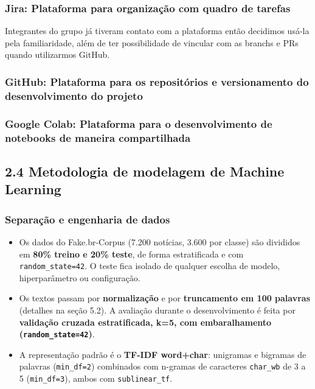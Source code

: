\documentclass[
  brazilian,
  11pt,
]{article}
\providecommand{\tightlist}{%
  \setlength{\itemsep}{0pt}\setlength{\parskip}{0pt}}
\begin{document}
\subsubsection{\texorpdfstring{\textbf{Jira:} Plataforma para organização com quadro de tarefas}{Jira: Plataforma para organização com quadro de tarefas}}\label{jira-plataforma-para-organizauxe7uxe3o-com-quadro-de-tarefas}

Integrantes do grupo já tiveram contato com a plataforma então decidimos usá-la pela familiaridade, além de ter possibilidade de vincular com as branchs e PRs quando utilizarmos GitHub.

\subsubsection{\texorpdfstring{\textbf{GitHub:} Plataforma para os repositórios e versionamento do desenvolvimento do projeto}{GitHub: Plataforma para os repositórios e versionamento do desenvolvimento do projeto}}\label{github-plataforma-para-os-reposituxf3rios-e-versionamento-do-desenvolvimento-do-projeto}

\subsubsection{\texorpdfstring{\textbf{Google Colab:} Plataforma para o desenvolvimento de notebooks de maneira compartilhada}{Google Colab: Plataforma para o desenvolvimento de notebooks de maneira compartilhada}}\label{google-colab-plataforma-para-o-desenvolvimento-de-notebooks-de-maneira-compartilhada}

\subsection{2.4 Metodologia de modelagem de Machine Learning}\label{metodologia-de-modelagem-de-machine-learning}

\subsubsection{Separação e engenharia de dados}\label{separauxe7uxe3o-e-engenharia-de-dados}

\begin{itemize}
\tightlist
\item
  Os dados do Fake.br-Corpus (7.200 notícias, 3.600 por classe) são divididos em \textbf{80\% treino e 20\% teste}, de forma estratificada e com \texttt{random\_state=42}. O teste fica isolado de qualquer escolha de modelo, hiperparâmetro ou configuração.
\item
  Os textos passam por \textbf{normalização} e por \textbf{truncamento em 100 palavras} (detalhes na seção 5.2). A avaliação durante o desenvolvimento é feita por \textbf{validação cruzada estratificada, k=5, com embaralhamento (\texttt{random\_state=42})}.
\item
  A representação padrão é o \textbf{TF-IDF word+char}: unigramas e bigramas de palavras (\texttt{min\_df=2}) combinados com n-gramas de caracteres \texttt{char\_wb} de 3 a 5 (\texttt{min\_df=3}), ambos com \texttt{sublinear\_tf}.
\end{itemize}
\end{document}
